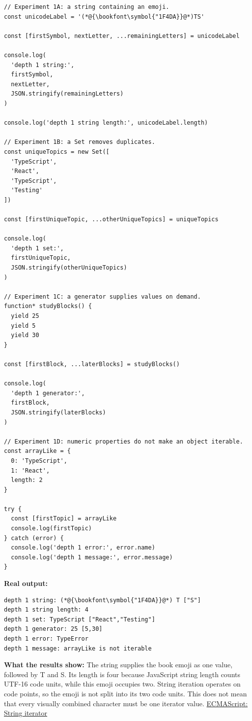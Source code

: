 \documentclass[10pt,a4paper]{article}
\begin{document}
\begin{lstlisting}[language=GuideJS]
// Experiment 1A: a string containing an emoji.
const unicodeLabel = '(*@{\bookfont\symbol{"1F4DA}}@*)TS'

const [firstSymbol, nextLetter, ...remainingLetters] = unicodeLabel

console.log(
  'depth 1 string:',
  firstSymbol,
  nextLetter,
  JSON.stringify(remainingLetters)
)

console.log('depth 1 string length:', unicodeLabel.length)

// Experiment 1B: a Set removes duplicates.
const uniqueTopics = new Set([
  'TypeScript',
  'React',
  'TypeScript',
  'Testing'
])

const [firstUniqueTopic, ...otherUniqueTopics] = uniqueTopics

console.log(
  'depth 1 set:',
  firstUniqueTopic,
  JSON.stringify(otherUniqueTopics)
)

// Experiment 1C: a generator supplies values on demand.
function* studyBlocks() {
  yield 25
  yield 5
  yield 30
}

const [firstBlock, ...laterBlocks] = studyBlocks()

console.log(
  'depth 1 generator:',
  firstBlock,
  JSON.stringify(laterBlocks)
)

// Experiment 1D: numeric properties do not make an object iterable.
const arrayLike = {
  0: 'TypeScript',
  1: 'React',
  length: 2
}

try {
  const [firstTopic] = arrayLike
  console.log(firstTopic)
} catch (error) {
  console.log('depth 1 error:', error.name)
  console.log('depth 1 message:', error.message)
}
\end{lstlisting}


\textbf{Real output:}

\begin{lstlisting}[language={}]
depth 1 string: (*@{\bookfont\symbol{"1F4DA}}@*) T ["S"]
depth 1 string length: 4
depth 1 set: TypeScript ["React","Testing"]
depth 1 generator: 25 [5,30]
depth 1 error: TypeError
depth 1 message: arrayLike is not iterable
\end{lstlisting}

\textbf{What the results show:} The string supplies the book emoji as one value, followed by T and S. Its length is four because JavaScript string length counts UTF-16 code units, while this emoji occupies two. String iteration operates on code points, so the emoji is not split into its two code units. This does not mean that every visually combined character must be one iterator value. \href{https://tc39.es/ecma262/multipage/text-processing.html\#sec-string.prototype-\%symbol.iterator\%}{ECMAScript: String iterator}
\end{document}

